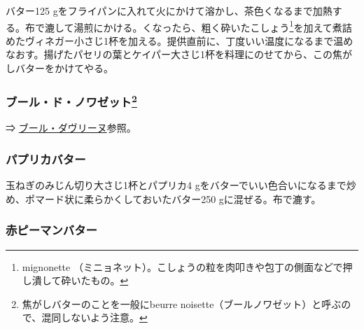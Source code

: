 \begin{recette}
バター125
gをフライパンに入れて火にかけて溶かし、茶色くなるまで加熱する。布で漉して湯煎にかける。くなったら、粗く砕いたこしょう\footnote{mignonette
  （ミニョネット）。こしょうの粒を肉叩きや包丁の側面などで押し潰して砕いたもの。}を加えて煮詰めたヴィネガー小さじ1杯を加える。提供直前に、丁度いい温度になるまで温めなおす。揚げたパセリの葉とケイパー大さじ1杯を料理にのせてから、この焦がしバターをかけてやる。

\hypertarget{beurre-de-noisette}{%
\subsubsection[ブール・ド・ノワゼット]{\texorpdfstring{ブール・ド・ノワゼット\footnote{焦がしバターのことを一般にbeurre
  noisette（ブールノワゼット）と呼ぶので、混同しないよう注意。}}{ブール・ド・ノワゼット}}\label{beurre-de-noisette}}



⇒ \protect\hyperlink{beurre-d-aveline}{ブール・ダヴリーヌ}参照。

\hypertarget{beurre-de-paprika}{%
\subsubsection{パプリカバター}\label{beurre-de-paprika}}



玉ねぎのみじん切り大さじ1杯とパプリカ4
gをバターでいい色合いになるまで炒め、ポマード状に柔らかくしておいたバター250
gに混ぜる。布で漉す。

\hypertarget{beurre-de-pimentos}{%
\subsubsection{赤ピーマンバター}\label{beurre-de-pimentos}}




\end{recette}
